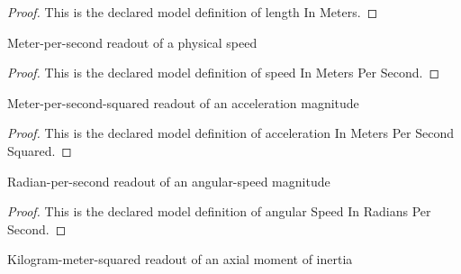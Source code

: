 \begin{proof}
  This is the declared model definition of length In Meters.
\end{proof}
\begin{definition}
  \label{def:physics:phyx-mini-0775:phyxminiproblems-problemphyxmini0775-speedinmeterspersecond}
  Meter-per-second readout of a physical speed
\end{definition}
\begin{proof}
  This is the declared model definition of speed In Meters Per Second.
\end{proof}
\begin{definition}
  \label{def:physics:phyx-mini-0775:phyxminiproblems-problemphyxmini0775-accelerationinmeterspersecondsquared}
  Meter-per-second-squared readout of an acceleration magnitude
\end{definition}
\begin{proof}
  This is the declared model definition of acceleration In Meters Per Second Squared.
\end{proof}
\begin{definition}
  \label{def:physics:phyx-mini-0775:phyxminiproblems-problemphyxmini0775-angularspeedinradianspersecond}
  Radian-per-second readout of an angular-speed magnitude
\end{definition}
\begin{proof}
  This is the declared model definition of angular Speed In Radians Per Second.
\end{proof}
\begin{definition}
  \label{def:physics:phyx-mini-0775:phyxminiproblems-problemphyxmini0775-momentofinertiainkilogrammeterssquared}
  Kilogram-meter-squared readout of an axial moment of inertia
\end{definition}
